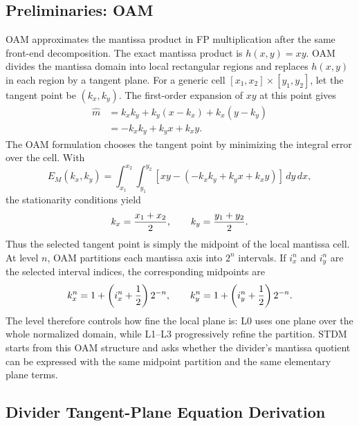 \documentclass[conference]{IEEEtran}
\begin{document}
\subsection{Preliminaries: OAM}
OAM approximates the mantissa product in FP multiplication after the same
front-end decomposition. The exact mantissa product is $h(x,y)=xy$. OAM divides
the mantissa domain into local
rectangular regions and replaces $h(x,y)$ in each region by a tangent plane.
For a generic cell $[x_1,x_2]\times[y_1,y_2]$, let the tangent point be
$(k_x,k_y)$. The first-order expansion of $xy$ at this point gives
\begin{equation}
\begin{aligned}
\widehat{m}
&= k_xk_y+k_y(x-k_x)+k_x(y-k_y) \\
&= -k_xk_y+k_yx+k_xy .
\end{aligned}
\label{eq:oam_plane_prelim}
\end{equation}
The OAM formulation chooses the tangent point by minimizing the integral error
over the cell. With
\begin{equation}
E_M(k_x,k_y)=\int_{x_1}^{x_2}\int_{y_1}^{y_2}
\left[xy-(-k_xk_y+k_yx+k_xy)\right]\,dy\,dx,
\end{equation}
the stationarity conditions yield
\begin{equation}
k_x={x_1+x_2\over2},\qquad k_y={y_1+y_2\over2}.
\label{eq:oam_midpoint_prelim}
\end{equation}
Thus the selected tangent point is simply the midpoint of the local mantissa
cell. At level $n$, OAM partitions each mantissa axis into $2^n$ intervals. If
$i_x^n$ and $i_y^n$ are the selected interval indices, the corresponding
midpoints are
\begin{equation}
k_x^n=1+\left(i_x^n+{1\over2}\right)2^{-n},\qquad
k_y^n=1+\left(i_y^n+{1\over2}\right)2^{-n}.
\end{equation}
The level therefore controls how fine the local plane is: L0 uses one plane
over the whole normalized domain, while L1--L3 progressively refine the
partition. STDM starts from this OAM structure and asks whether the divider's
mantissa quotient can be expressed with the same midpoint partition and the
same elementary plane terms.

\subsection{Divider Tangent-Plane Equation Derivation}
\end{document}
